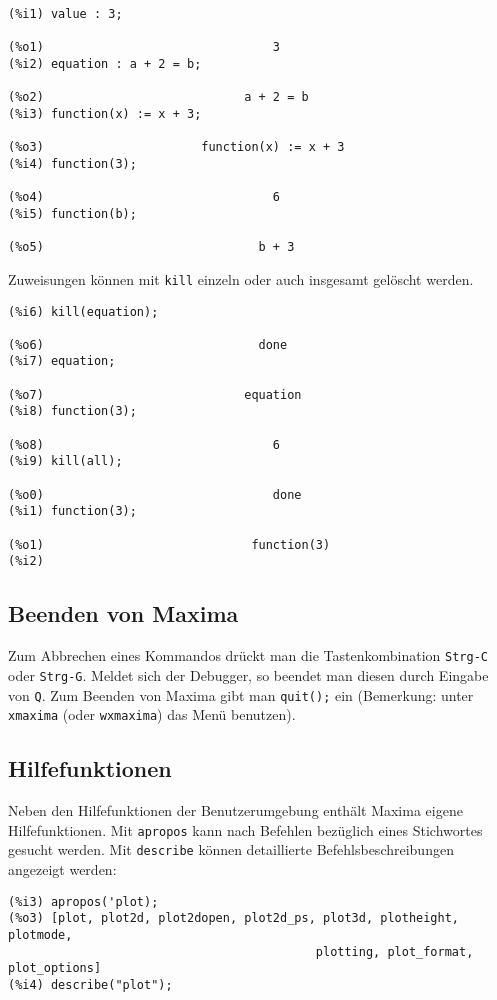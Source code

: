 \documentclass[12pt]{scrartcl}
\begin{document}
\begin{verbatim}
(%i1) value : 3;

(%o1)                                3
(%i2) equation : a + 2 = b;

(%o2)                            a + 2 = b
(%i3) function(x) := x + 3;

(%o3)                      function(x) := x + 3
(%i4) function(3);

(%o4)                                6
(%i5) function(b);

(%o5)                              b + 3
\end{verbatim}

Zuweisungen können mit \texttt{kill} einzeln oder auch insgesamt gelöscht werden.
\begin{verbatim}
(%i6) kill(equation);

(%o6)                              done
(%i7) equation;

(%o7)                            equation
(%i8) function(3);

(%o8)                                6
(%i9) kill(all);

(%o0)                                done
(%i1) function(3);

(%o1)                             function(3)
(%i2)
\end{verbatim}

\subsection{Beenden von Maxima}

Zum Abbrechen eines Kommandos drückt man die Tastenkombination
\texttt{Strg-C} oder \texttt{Strg-G}. Meldet sich der Debugger, so beendet
man diesen durch Eingabe  von \texttt{Q}.
Zum Beenden von Maxima gibt man \texttt{quit();} ein (Bemerkung: unter
\texttt{xmaxima} (oder \texttt{wxmaxima}) das Menü benutzen).


\subsection{Hilfefunktionen}

Neben den Hilfefunktionen der Benutzerumgebung enthält Maxima eigene
Hilfefunktionen. Mit \texttt{apropos} kann nach Befehlen bezüglich
eines Stichwortes gesucht werden. Mit \texttt{describe} können
detaillierte Befehlsbeschreibungen angezeigt werden:

\begin{verbatim}
(%i3) apropos('plot);
(%o3) [plot, plot2d, plot2dopen, plot2d_ps, plot3d, plotheight, plotmode,
                                           plotting, plot_format, plot_options]
(%i4) describe("plot");
\end{verbatim}
\end{document}
